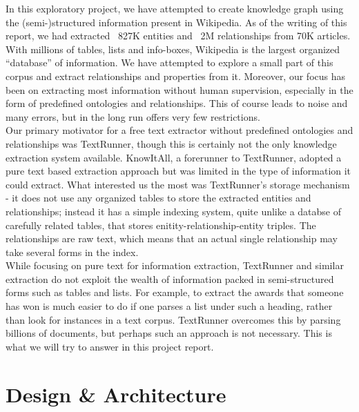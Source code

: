 \documentclass[11pt,twocolumn]{article}
\begin{document}
In this exploratory project, we have attempted to create knowledge graph using the (semi-)structured information present in Wikipedia. As of the writing of this report, we had extracted ~827K entities and ~2M relationships from 70K articles. With millions of tables, lists and info-boxes, Wikipedia is the largest organized ``database'' of information. We have attempted to explore a small part of this corpus and extract relationships and properties from it. Moreover, our focus has been on extracting most information without human supervision, especially in the form of predefined ontologies and relationships. This of course leads to noise and many errors, but in the long run offers very few restrictions.\\

Our primary motivator for a free text extractor without predefined ontologies and relationships was TextRunner, though this is certainly not the only knowledge extraction system available. KnowItAll, a forerunner to TextRunner, adopted a pure text based extraction approach but was limited in the type of information it could extract. What interested us the most was TextRunner's storage mechanism - it does not use any organized tables to store the extracted entities and relationships; instead it has a simple indexing system, quite unlike a databse of carefully related tables, that stores enitity-relationship-entity triples. The relationships are raw text, which means that an actual single relationship may take several forms in the index.\\

While focusing on pure text for information extraction, TextRunner and similar extraction do not exploit the wealth of information packed in semi-structured forms such as tables and lists. For example, to extract the awards that someone has won is much easier to do if one parses a list under such a heading, rather than look for instances in a text corpus. TextRunner overcomes this by parsing billions of documents, but perhaps such an approach is not necessary. This is what we will try to answer in this project report.


\section{Design \& Architecture}
\end{document}
